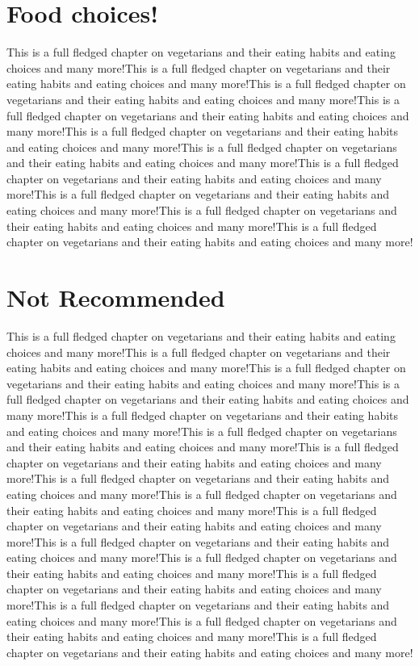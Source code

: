 \section{Food choices!}
This is a full fledged chapter on vegetarians and their eating habits and eating choices and many more!This is a full fledged chapter on vegetarians and their eating habits and eating choices and many more!This is a full fledged chapter on vegetarians and their eating habits and eating choices and many more!This is a full fledged chapter on vegetarians and their eating habits and eating choices and many more!This is a full fledged chapter on vegetarians and their eating habits and eating choices and many more!This is a full fledged chapter on vegetarians and their eating habits and eating choices and many more!This is a full fledged chapter on vegetarians and their eating habits and eating choices and many more!This is a full fledged chapter on vegetarians and their eating habits and eating choices and many more!This is a full fledged chapter on vegetarians and their eating habits and eating choices and many more!This is a full fledged chapter on vegetarians and their eating habits and eating choices and many more!
\section{Not Recommended}
This is a full fledged chapter on vegetarians and their eating habits and eating choices and many more!This is a full fledged chapter on vegetarians and their eating habits and eating choices and many more!This is a full fledged chapter on vegetarians and their eating habits and eating choices and many more!This is a full fledged chapter on vegetarians and their eating habits and eating choices and many more!This is a full fledged chapter on vegetarians and their eating habits and eating choices and many more!This is a full fledged chapter on vegetarians and their eating habits and eating choices and many more!This is a full fledged chapter on vegetarians and their eating habits and eating choices and many more!This is a full fledged chapter on vegetarians and their eating habits and eating choices and many more!This is a full fledged chapter on vegetarians and their eating habits and eating choices and many more!This is a full fledged chapter on vegetarians and their eating habits and eating choices and many more!This is a full fledged chapter on vegetarians and their eating habits and eating choices and many more!This is a full fledged chapter on vegetarians and their eating habits and eating choices and many more!This is a full fledged chapter on vegetarians and their eating habits and eating choices and many more!This is a full fledged chapter on vegetarians and their eating habits and eating choices and many more!This is a full fledged chapter on vegetarians and their eating habits and eating choices and many more!This is a full fledged chapter on vegetarians and their eating habits and eating choices and many more!